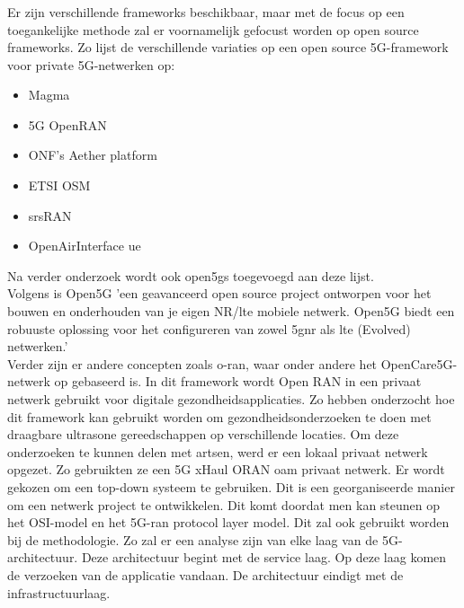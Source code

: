 \subsubsection{}
\label{framework}

Er zijn verschillende frameworks beschikbaar, maar met de focus op een toegankelijke methode zal er voornamelijk gefocust worden op open source frameworks. Zo lijst \textcite{Eswaran2022} de verschillende variaties op een open source 5G-framework voor private 5G-netwerken op:

\begin{itemize}
  \item Magma
  \item 5G OpenRAN
  \item ONF's Aether platform
  \item ETSI OSM
  \item \gls{srsRAN}
  \item OpenAirInterface \gls{ue}
\end{itemize}

Na verder onderzoek wordt ook \gls{open5gs} toegevoegd aan deze lijst.\\

Volgens \textcite{Open5GS2024} is Open5G 'een geavanceerd open source project ontworpen voor het bouwen en onderhouden van je eigen NR/\gls{lte} mobiele netwerk. Open5G biedt een robuuste oplossing voor het configureren van zowel \gls{5gnr} als \gls{lte} (Evolved) netwerken.' \\ Verder zijn er andere concepten zoals \gls{o-ran}, waar onder andere het OpenCare5G-netwerk op gebaseerd is. In dit framework wordt Open RAN in een privaat netwerk gebruikt voor digitale gezondheidsapplicaties. Zo hebben \textcite{de2023opencare5g} onderzocht hoe dit framework kan gebruikt worden om gezondheidsonderzoeken te doen met draagbare ultrasone gereedschappen op verschillende locaties. Om deze onderzoeken te kunnen delen met artsen, werd er een lokaal privaat netwerk opgezet. Zo gebruikten ze een 5G xHaul ORAN \gls{oam} privaat netwerk. Er wordt gekozen om een top-down systeem te gebruiken. Dit is een georganiseerde manier om een netwerk project te ontwikkelen. Dit komt doordat men kan steunen op het OSI-model en het 5G-\gls{ran} protocol layer model. Dit zal ook gebruikt worden bij de methodologie. Zo zal er een analyse zijn van elke laag van de 5G-architectuur. Deze architectuur begint met de service laag. Op deze laag komen de verzoeken van de applicatie vandaan. De architectuur eindigt met de infrastructuurlaag. \autocite{de2023opencare5g}

